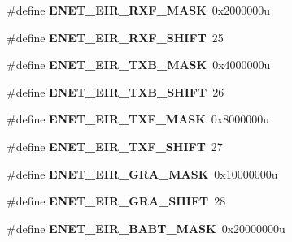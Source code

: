 \begin{DoxyCompactItemize}
\item 
\#define {\bfseries E\+N\+E\+T\+\_\+\+E\+I\+R\+\_\+\+R\+X\+F\+\_\+\+M\+A\+SK}~0x2000000u\hypertarget{group__ENET__Register__Masks_ga2a20a0e36978d9064e91cce092593fed}{}\label{group__ENET__Register__Masks_ga2a20a0e36978d9064e91cce092593fed}

\item 
\#define {\bfseries E\+N\+E\+T\+\_\+\+E\+I\+R\+\_\+\+R\+X\+F\+\_\+\+S\+H\+I\+FT}~25\hypertarget{group__ENET__Register__Masks_ga7b2d30f7f3e517d68feba7edd38c0c9c}{}\label{group__ENET__Register__Masks_ga7b2d30f7f3e517d68feba7edd38c0c9c}

\item 
\#define {\bfseries E\+N\+E\+T\+\_\+\+E\+I\+R\+\_\+\+T\+X\+B\+\_\+\+M\+A\+SK}~0x4000000u\hypertarget{group__ENET__Register__Masks_ga8ba9c1624177eb39a170b3b365859ced}{}\label{group__ENET__Register__Masks_ga8ba9c1624177eb39a170b3b365859ced}

\item 
\#define {\bfseries E\+N\+E\+T\+\_\+\+E\+I\+R\+\_\+\+T\+X\+B\+\_\+\+S\+H\+I\+FT}~26\hypertarget{group__ENET__Register__Masks_gaa855bd984448a54af78d55584c066594}{}\label{group__ENET__Register__Masks_gaa855bd984448a54af78d55584c066594}

\item 
\#define {\bfseries E\+N\+E\+T\+\_\+\+E\+I\+R\+\_\+\+T\+X\+F\+\_\+\+M\+A\+SK}~0x8000000u\hypertarget{group__ENET__Register__Masks_ga06433ca8a67a5460754fe9b2074d8520}{}\label{group__ENET__Register__Masks_ga06433ca8a67a5460754fe9b2074d8520}

\item 
\#define {\bfseries E\+N\+E\+T\+\_\+\+E\+I\+R\+\_\+\+T\+X\+F\+\_\+\+S\+H\+I\+FT}~27\hypertarget{group__ENET__Register__Masks_gaefe127d672dddef700ffb0f0cac33df7}{}\label{group__ENET__Register__Masks_gaefe127d672dddef700ffb0f0cac33df7}

\item 
\#define {\bfseries E\+N\+E\+T\+\_\+\+E\+I\+R\+\_\+\+G\+R\+A\+\_\+\+M\+A\+SK}~0x10000000u\hypertarget{group__ENET__Register__Masks_ga172383b70c089716b68b3ffa7c6a5cd9}{}\label{group__ENET__Register__Masks_ga172383b70c089716b68b3ffa7c6a5cd9}

\item 
\#define {\bfseries E\+N\+E\+T\+\_\+\+E\+I\+R\+\_\+\+G\+R\+A\+\_\+\+S\+H\+I\+FT}~28\hypertarget{group__ENET__Register__Masks_gaaf2ca77536e8dbd47979124db1d4cb3c}{}\label{group__ENET__Register__Masks_gaaf2ca77536e8dbd47979124db1d4cb3c}

\item 
\#define {\bfseries E\+N\+E\+T\+\_\+\+E\+I\+R\+\_\+\+B\+A\+B\+T\+\_\+\+M\+A\+SK}~0x20000000u\hypertarget{group__ENET__Register__Masks_ga2ee6dd7628d551b9a94c482a567d21fa}{}\label{group__ENET__Register__Masks_ga2ee6dd7628d551b9a94c482a567d21fa}


\end{DoxyCompactItemize}
